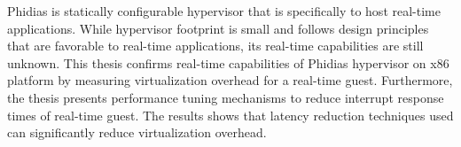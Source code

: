 Phidias is statically configurable hypervisor that is specifically to host real-time applications.
While hypervisor footprint is small and follows design principles that are favorable to real-time applications, its
real-time capabilities are still unknown. This thesis confirms real-time capabilities of Phidias hypervisor on x86 platform
by measuring virtualization overhead for a real-time guest. Furthermore, the thesis presents performance tuning
mechanisms to reduce interrupt response times of real-time guest. 
The results shows that latency reduction techniques used can significantly reduce virtualization overhead.



